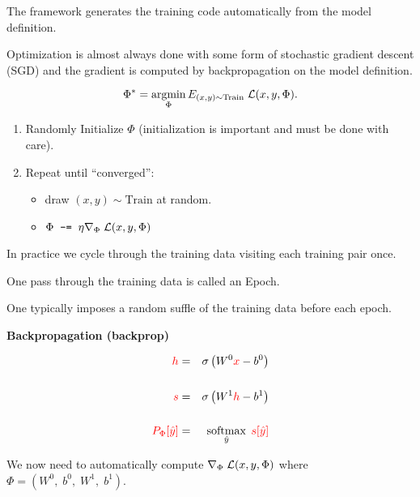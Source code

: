 {\vfill
The framework generates the training code automatically from the model definition.

\vfill
{\color{red} Optimization is almost always done with some form of stochastic gradient descent (SGD) and the gradient is computed
by backpropagation on the model definition.}

\slide{}
$$\Phi^* = \operatorname*{argmin}_\Phi E_{(x,y) \sim \mathrm{Train}} \; {\cal L}(x,y,\Phi).$$

\vfill
\begin{enumerate}
\item Randomly Initialize $\Phi$ (initialization is important and must be done with care).

  \vfill
  \item Repeat until ``converged'':

    \vfill
    \begin{itemize}
    \item draw $(x,y) \sim \mathrm{Train}$ at random.
      \vfill
    \item $\Phi \;\;\mbox{\tt -=}\;\; \eta \nabla_\Phi\;{\cal L}(x,y,\Phi)$
    \end{itemize}
\end{enumerate}


In practice we cycle through the training data visiting each training pair once.

\vfill
One pass through the training data is called an Epoch.

\vfill
One typically imposes a random suffle of the training data before each epoch.

\slide{}
\centerline{\bf Backpropagation (backprop)}

\slide{}

\begin{eqnarray*}
  {\color{red} h} & = & \sigma\left(W^0{\color{red} x} - b^0\right) \\
  \\
  {\color{red} s} & = & \sigma\left(W^1{\color{red} h} - b^1 \right) \\
  \\
  {\color{red} P_\Phi[\hat{y}]} & = & \operatorname*{softmax}_{\hat{y}}\;{\color{red} s[\hat{y}]}
\end{eqnarray*}

\vfill
We now need to automatically compute $\nabla_\Phi \; {\cal L}(x,y,\Phi)$
where $\Phi = (W^0,\;b^0,\;W^1,\;b^1)$.


}
